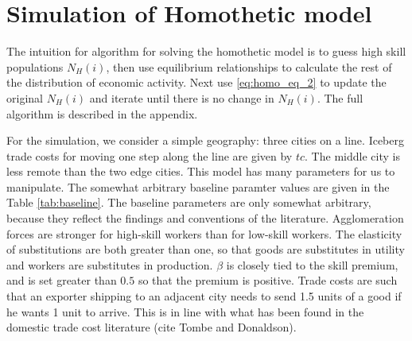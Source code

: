 \documentclass{article}
\begin{document}
\section{Simulation of Homothetic model}

The intuition for algorithm for solving the homothetic model is to guess high skill populations $N_H(i)$, then use equilibrium relationships to calculate the rest of the distribution of economic activity.  Next use \eqref{eq:homo_eq_2} to update the original $N_H(i)$ and iterate until there is no change in $N_H(i)$.  The full algorithm is described in the appendix.

For the simulation, we consider a simple geography: three cities on a line.  Iceberg trade costs for moving one step along the line are given by $tc$.  The middle city is less remote than the two edge cities.  This model has many parameters for us to manipulate.  The somewhat arbitrary baseline paramter values are given in the Table \ref{tab:baseline}.  The baseline parameters are only somewhat arbitrary, because they reflect the findings and conventions of the literature.  Agglomeration forces are stronger for high-skill workers than for low-skill workers.  The elasticity of substitutions are both greater than one, so that goods are substitutes in utility and workers are substitutes in production.  $\beta$ is closely tied to the skill premium, and is set greater than $0.5$ so that the premium is positive.  Trade costs are such that an exporter shipping to an adjacent city needs to send 1.5 units of a good if he wants 1 unit to arrive.  This is in line with what has been found in the domestic trade cost literature (cite Tombe and Donaldson).
\end{document}

